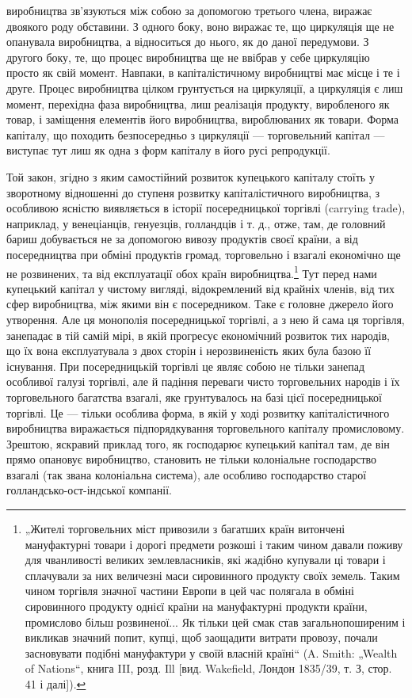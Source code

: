 \parcont{}  %
виробництва зв’язуються між собою за допомогою третього члена,
виражає двоякого роду обставини. З одного боку, воно виражає
те, що циркуляція ще не опанувала виробництва, а відноситься до
нього, як до даної передумови. З другого боку, те, що процес
виробництва ще не ввібрав у себе циркуляцію просто як свій
момент. Навпаки, в капіталістичному виробництві має місце і те
і друге. Процес виробництва цілком грунтується на циркуляції, а
циркуляція є лиш момент, перехідна фаза виробництва, лиш реалізація
продукту, виробленого як товар, і заміщення елементів
його виробництва, вироблюваних як товари. Форма капіталу, що
походить безпосередньо з циркуляції — торговельний капітал —
виступає тут лиш як одна з форм капіталу в його русі репродукції.

Той закон, згідно з яким самостійний розвиток купецького капіталу
стоїть у зворотному відношенні до ступеня розвитку капіталістичного
виробництва, з особливою ясністю виявляється в історії
посередницької торгівлі (carrying trade), наприклад, у венеціанців,
генуезців, голландців і т. д., отже, там, де головний бариш
добувається не за допомогою вивозу продуктів своєї країни,
а від посередництва при обміні продуктів громад, торговельно
і взагалі економічно ще не розвинених, та від експлуатації обох
країн виробництва.\footnote{
„Жителі торговельних міст привозили з багатших країн витончені мануфактурні
товари і дорогі предмети розкоші і таким чином давали поживу для
чванливості великих землевласників, які жадібно купували ці товари і сплачували
за них величезні маси сировинного продукту своїх земель. Таким чином торгівля
значної частини Европи в цей час полягала в обміні сировинного продукту
однієї країни на мануфактурні продукти країни, промислово більш розвиненої...
Як тільки цей смак став загальнопоширеним і викликав значний попит, купці,
щоб заощадити витрати провозу, почали засновувати подібні мануфактури
у своїй власній країні“ (A. Smith: „Wealth of Nations“, книга III, розд. Ill [вид.
Wakefield, Лондон 1835/39, т. З, стор. 41 і далі]).
} Тут перед нами купецький капітал у чистому
вигляді, відокремлений від крайніх членів, від тих сфер
виробництва, між якими він є посередником. Таке є головне
джерело його утворення. Але ця монополія посередницької торгівлі,
а з нею й сама ця торгівля, занепадає в тій самій мірі,
в якій прогресує економічний розвиток тих народів, що їх вона
експлуатувала з двох сторін і нерозвиненість яких була базою
її існування. При посередницькій торгівлі це являє собою не
тільки занепад особливої галузі торгівлі, але й падіння переваги
чисто торговельних народів і їх торговельного багатства
взагалі, яке грунтувалось на базі цієї посередницької торгівлі.
Це — тільки особлива форма, в якій у ході розвитку капіталістичного
виробництва виражається підпорядкування торговельного
капіталу промисловому. Зрештою, яскравий приклад
того, як господарює купецький капітал там, де він прямо опановує
виробництво, становить не тільки колоніальне господарство
взагалі (так звана колоніальна система), але особливо господарство
старої голландсько-ост-індської компанії.
